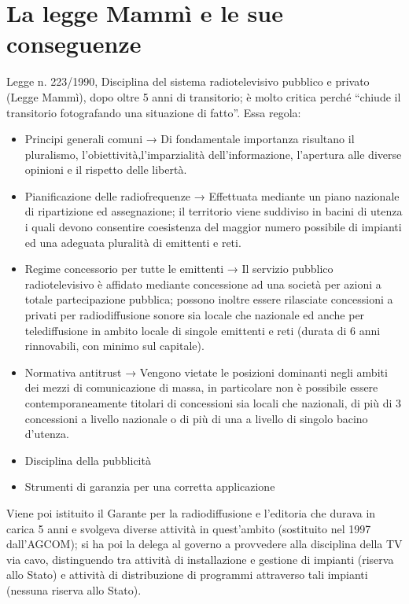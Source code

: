 \section{La legge Mammì e le sue conseguenze}

Legge n. 223/1990, Disciplina del sistema radiotelevisivo pubblico e privato (Legge Mammì), dopo oltre 5
anni di transitorio; è molto critica perché “chiude il transitorio fotografando una situazione di fatto”. Essa
regola:
\begin{itemize}
    \item Principi generali comuni → Di fondamentale importanza risultano il pluralismo, l’obiettività,l’imparzialità dell’informazione, l’apertura alle diverse opinioni e il rispetto delle libertà.
    \item Pianificazione delle radiofrequenze → Effettuata mediante un piano nazionale di ripartizione ed assegnazione; il territorio viene suddiviso in bacini di utenza i quali devono consentire coesistenza del maggior numero possibile di impianti ed una adeguata pluralità di emittenti e reti.
    \item Regime concessorio per tutte le emittenti → Il servizio pubblico radiotelevisivo è affidato mediante concessione ad una società per azioni a totale partecipazione pubblica; possono inoltre essere rilasciate concessioni a privati per radiodiffusione sonore sia locale che nazionale ed anche per telediffusione in ambito locale di singole emittenti e reti (durata di 6 anni rinnovabili, con minimo sul capitale).
    \item Normativa antitrust → Vengono vietate le posizioni dominanti negli ambiti dei mezzi di comunicazione di massa, in particolare non è possibile essere contemporaneamente titolari di concessioni sia locali che nazionali, di più di 3 concessioni a livello nazionale o di più di una a livello di singolo bacino d’utenza.
    \item Disciplina della pubblicità
    \item Strumenti di garanzia per una corretta applicazione
\end{itemize}

Viene poi istituito il Garante per la radiodiffusione e l’editoria che durava in carica 5 anni e svolgeva diverse attività in quest’ambito (sostituito nel 1997 dall’AGCOM); si ha poi la delega al governo a provvedere alla disciplina della TV via cavo, distinguendo tra attività di installazione e gestione di impianti (riserva allo Stato) e attività di distribuzione di programmi attraverso tali impianti (nessuna riserva allo Stato).


